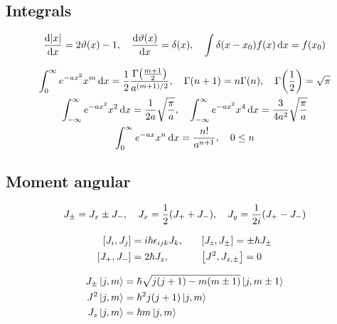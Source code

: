 \subsection{Integrals}
\begin{align*}
	\dv{\abs{x}}{x} = 2 \vartheta(x) - 1 \qc \dv{\vartheta(x)}{x} = \delta(x) \qc \int \delta(x - x_{0}) f(x) \dd{x} = f(x_{0})
\end{align*}

\begin{align*}
\begin{gathered}
	\int_{0}^{\infty} e^{-ax^2} x^{m} \dd{x} = \frac{1}{2} \frac{\Gamma\qty(\frac{m+1}{2})}{a^{(m+1)/2}} \qc \Gamma(n+1) = n \Gamma(n) \qc \Gamma\qty(\frac{1}{2}) = \sqrt{\pi} \\
	\int_{-\infty}^{\infty} e^{-ax^2} x^{2} \dd{x} = \dfrac{1}{2a} \sqrt{\dfrac{\pi}{a}} \qc \int_{-\infty}^{\infty} e^{-ax^2} x^{4} \dd{x} = \dfrac{3}{4a^{2}} \sqrt{\dfrac{\pi}{a}} \\
	\int_{0}^{\infty} e^{-ax} x^{n} \dd{x} = \dfrac{n!}{a^{n+1}} \qc 0 \leq n \\
\end{gathered}
\end{align*}

\subsection{Moment angular}
\begin{align*}
	J_{\pm} = J_{x} \pm J_{-} \qc J_{x} = \frac{1}{2} \qty(J_{+} + J_{-}) \qc J_{y} = \frac{1}{2i} \qty(J_{+} - J_{-})
\end{align*}

\begin{alignat*}{2}
	\qty[J_{i},J_{j}] &= i \hbar \epsilon_{ijk} J_{k} \qc && \qty[J_{z},J_{\pm}] = \pm \hbar J_{\pm} \\
	\qty[J_{+},J_{-}] &= 2\hbar J_{z} \qc && \qty[J^{2},J_{z, \pm}] = 0
\end{alignat*}

\begin{align*}
\begin{aligned}
	J_{\pm} \ket{j,m} &= \hbar \sqrt{j(j + 1) - m(m \pm 1)} \ket{j,m \pm 1} \\
	J^{2} \ket{j,m} &= \hbar^{2} j(j + 1) \ket{j,m} \\
	J_{z} \ket{j,m} &= \hbar m \ket{j,m}
\end{aligned}
\end{align*}

